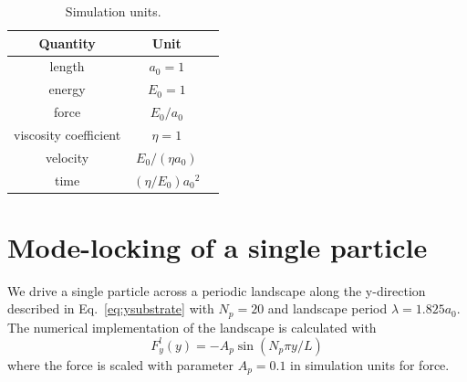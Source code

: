 \documentclass[twocolumn,preprintnumbers,amsmath,amssymb,aps,prx]{revtex4}
\begin{document}
\begin{table}[h!]
\centering
\caption{Simulation units.}
\begin{ruledtabular}
\begin{tabular}{c c p{5cm}}
Quantity & Unit \\
\hline
length &  $a_0 = 1$ \\
energy & $E_0 = 1$ \\
force & $E_0 / a_0$\\
viscosity coefficient & $\eta = 1$ \\
velocity &  $ E_0 / (\eta a_0) $ \\
time &  $(\eta / E_0) {a_0}^2$ \\
\end{tabular}
\end{ruledtabular}
\label{tab:1}
\end{table}


%
\section{Mode-locking of a single particle}
\label{sec:one}

We drive a single particle across a periodic landscape 
along the y-direction described in Eq.~\ref{eq:ysubstrate}
with $N_p=20$ %
and landscape period $\lambda = 1.825 a_0$.
%
The numerical implementation of the landscape 
is calculated with
\begin{equation}
  \label{eq:force}
  F^l_y(y) = -A_{p} \sin{(N_p \pi y / L)} 
\end{equation}
where the force is scaled with parameter $A_{p} = 0.1$
in simulation units for force. %
\end{document}
